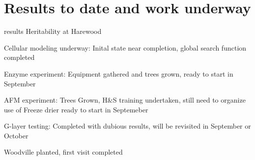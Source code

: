\section{Results to date and work underway}
results
Heritability at Harewood

Cellular modeling underway:
Inital state near completion, global search function completed

Enzyme experiment: 
Equipment gathered and trees grown, ready to start in September

AFM experiment:
Trees Grown, H&S training undertaken, still need to organize use of Freeze drier
ready to start in Septemeber

G-layer testing:
Completed with dubious results, will be revisited in September or October

Woodville planted, first visit completed
